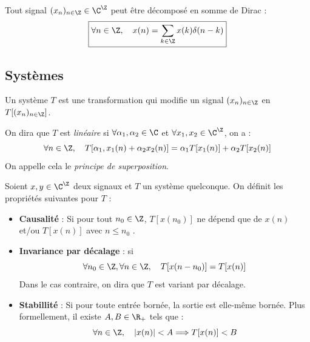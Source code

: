 \begin{theorem}[Décomposition]
    Tout signal $(x_n)_{n \in \Z} \in \C^\Z$ peut être décomposé en somme de Dirac : 
        \begin{equation}
            \boxed{\forall n \in \Z, \quad x(n) = \sum_{k \in \Z} x(k) \delta(n - k)}
        \end{equation}
\end{theorem}

\subsection{Systèmes}

\begin{definition}[Système]
    Un système $T$ est une transformation qui modifie un signal $(x_n)_{n \in \Z}$ en 
    $T[(x_n)_{n \in \Z}]$. 

    On dira que $T$ est \emph{linéaire} si $ \forall \alpha_1, \alpha_2 \in \C$ et 
    $ \forall x_1, x_2 \in \C^\Z$, on a :
        \begin{equation}
            \forall n \in \Z, \quad T[ \alpha_1, x_1(n) + \alpha_2 x_2(n)] = \alpha_1 T[x_1(n)] + \alpha_2 T[x_2(n)] 
        \end{equation}
    On appelle cela le \emph{principe de superposition}. 
\end{definition}

\begin{prop}
    Soient $x,y \in \C^\Z$ deux signaux et $T$ un système quelconque. 
    On définit les propriétés suivantes pour $T$ : 
    \begin{itemize}
        \item \textbf{Causalité} : Si pour tout $n_0 \in \Z$, $T[x(n_0)]$ 
        ne dépend que de $x(n)$ et/ou $T[x(n)]$ avec $n \leqslant n_0$ . 
        \item \textbf{Invariance par décalage} : si 
            \begin{equation}
                \forall n_0 \in \Z, \forall n \in \Z, \quad T[x(n - n_0)] = T[x(n)] 
            \end{equation}
        Dans le cas contraire, on dira que $T$ est variant par décalage. 
        \item \textbf{Stabillité} : Si pour toute entrée bornée, la sortie est elle-même bornée. 
        Plus formellement, il existe $A,B \in \R_+$ tels que : 
            \begin{equation}
                \forall n \in \Z, \quad |x(n)| < A \Longrightarrow T[x(n)] < B 
            \end{equation}
    \end{itemize}
\end{prop}

